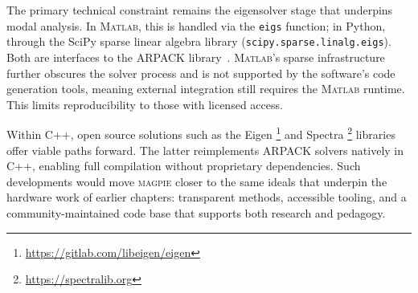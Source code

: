 The primary technical constraint remains the eigensolver stage that underpins modal analysis. In M\textsc{atlab}, this is handled via the \texttt{eigs} function; in Python, through the SciPy sparse linear algebra library (\texttt{scipy.sparse.linalg.eigs}). Both are interfaces to the ARPACK library~\cite{lehoucq_arpack_1998}. M\textsc{atlab}'s sparse infrastructure~\cite{gilbert_sparse_1992} further obscures the solver process and is not supported by the software’s code generation tools, meaning external integration still requires the M\textsc{atlab} runtime. This limits reproducibility to those with licensed access.

Within \textsc{C++}, open source solutions such as the Eigen%
\footnote{\url{https://gitlab.com/libeigen/eigen}} and Spectra%
\footnote{\url{https://spectralib.org}} libraries offer viable paths forward. The latter reimplements ARPACK solvers natively in C++, enabling full compilation without proprietary dependencies. Such developments would move \textsc{magpie} closer to the same ideals that underpin the hardware work of earlier chapters: transparent methods, accessible tooling, and a community-maintained code base that supports both research and pedagogy.

